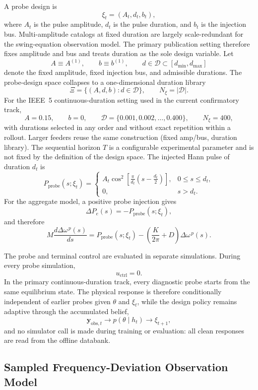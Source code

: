 \documentclass[11pt]{article}
\begin{document}
A probe design is
\[
\xi_t=(A_t,d_t,b_t),
\]
where \(A_t\) is the pulse amplitude, \(d_t\) is the pulse duration, and
\(b_t\) is the injection bus. Multi-amplitude catalogs at fixed duration are
largely scale-redundant for the swing-equation observation model. The primary
publication setting therefore fixes amplitude and bus and treats duration as the
sole design variable. Let
\[
A\equiv A^{(1)},
\qquad
b\equiv b^{(1)},
\qquad
d\in\mathcal D\subset[d_{\min},d_{\max}]
\]
denote the fixed amplitude, fixed injection bus, and admissible durations. The
probe-design space collapses to a one-dimensional duration library
\[
\boxed{
\Xi
=
\bigl\{(A,d,b):d\in\mathcal D\bigr\},
\qquad
N_\xi=|\mathcal D|.
}
\label{eq:design_space}
\]
For the IEEE~5 continuous-duration setting used in the current confirmatory
track,
\[
A=0.15,
\qquad
b=0,
\qquad
\mathcal D
=
\{0.001,0.002,\ldots,0.400\},
\qquad
N_\xi=400,
\]
with durations selected in any order and without exact repetition within a
rollout. Larger feeders reuse the same construction (fixed amp/bus, duration
library). The sequential horizon \(T\) is a configurable experimental parameter
and is not fixed by the definition of the design space. The injected Hann pulse of
duration \(d_t\) is
\[
P_{\mathrm{probe}}(s;\xi_t)
=
\begin{cases}
\displaystyle
A_t\cos^2
\left[
\frac{\pi}{d_t}
\left(
s-\frac{d_t}{2}
\right)
\right],
&
0\le s\le d_t,
\\[1.1em]
0,
&
s>d_t.
\end{cases}
\label{eq:hann_probe}
\]
For the aggregate model, a positive probe injection gives
\[
\Delta P_e(s)=-P_{\mathrm{probe}}(s;\xi_t),
\]
and therefore
\[
M\frac{d\Delta\omega^{\,p}(s)}{ds}
=
P_{\mathrm{probe}}(s;\xi_t)
-
\left(
\frac{K}{2\pi}+D
\right)
\Delta\omega^{\,p}(s).
\label{eq:probe_model}
\]

The probe and terminal control are evaluated in separate simulations. During every probe simulation,
\[
u_{\mathrm{ctrl}}=0.
\]
In the primary continuous-duration track, every diagnostic probe starts from
the same equilibrium state. The physical response is therefore conditionally
independent of earlier probes given \(\theta\) and \(\xi_t\), while the design
policy remains adaptive through the accumulated belief,
\[
\mathbf y_{\mathrm{obs},t}
\longrightarrow
p(\theta\mid h_t)
\longrightarrow
\xi_{t+1},
\]
and no simulator call is made during training or evaluation: all clean
responses are read from the offline databank.

\subsection{Sampled Frequency-Deviation Observation Model}
\end{document}
